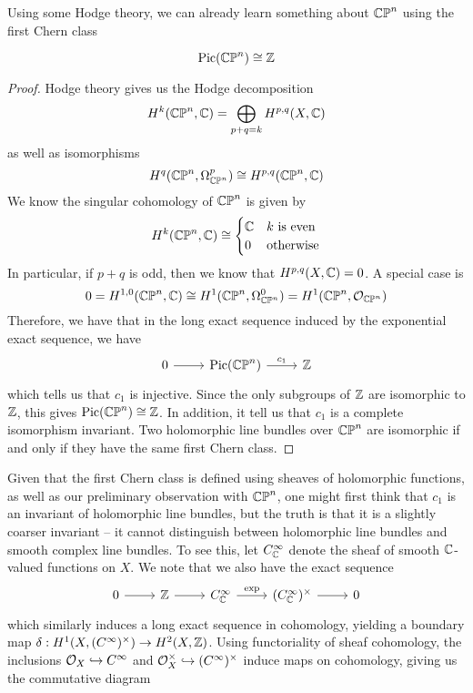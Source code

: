 Using some Hodge theory, we can already learn something about
$\mathbb{CP}^n$ using the first Chern class
%
\begin{thm}
\[
\mathrm{Pic}(\mathbb{CP}^n) \cong \mathbb{Z}
\]
\end{thm}
%
\begin{proof}
Hodge theory gives us the Hodge decomposition
\[
H^k(\mathbb{CP}^n, \mathbb{C}) = \bigoplus_{p+q=k} H^{p,q}(X, \mathbb{C})
\]
as well as isomorphisms
\[
H^q(\mathbb{CP}^n, \Omega^p_{\mathbb{CP}^n}) \cong H^{p,q}(\mathbb{CP}^n, \mathbb{C})
\]
We know the singular cohomology of $\mathbb{CP}^n$ is given by
\[
H^k(\mathbb{CP}^n, \mathbb{C}) \cong \begin{cases}
\mathbb{C} & k \text{ is even} \\
0 & \text{otherwise}
\end{cases}
\]
In particular, if $p+q$ is odd, then we know that $H^{p,q}(X,\mathbb{C}) = 0$.
A special case is
\[
0 = H^{1,0}(\mathbb{CP}^n, \mathbb{C}) \cong H^1(\mathbb{CP}^n, \Omega^0_{\mathbb{CP}^n}) = H^1(\mathbb{CP}^n, \mathcal{O}_{\mathbb{CP}^n})
\]
Therefore, we have that in the long exact sequence induced by the exponential exact
sequence, we have
\[\begin{tikzcd}
0 \ar[r] & \mathrm{Pic}(\CP^n) \ar[r, "c_1"] & \Z
\end{tikzcd}\]
which tells us that $c_1$ is injective. Since the only subgroups of $\mathbb{Z}$
are isomorphic to $\mathbb{Z}$, this gives $\mathrm{Pic}(\mathbb{CP}^n) \cong \mathbb{Z}$. In addition,
it tell us that $c_1$ is a complete isomorphism invariant. Two holomorphic line bundles
over $\mathbb{CP}^n$ are isomorphic if and only if they have the same first Chern class.
\end{proof}
%
Given that the first Chern class is defined using sheaves of holomorphic functions,
as well as our preliminary observation with $\mathbb{CP}^n$, one might first think that $c_1$ is
an invariant of holomorphic line bundles, but the truth is that it is a slightly coarser
invariant -- it cannot distinguish between holomorphic line bundles and smooth complex
line bundles. To see this, let $C^\infty_{\mathbb{C}}$ denote the sheaf of smooth $\mathbb{C}$-valued
functions on $X$. We note that we also have the exact sequence
\[\begin{tikzcd}
0 \ar[r] & \Z \ar[r] & C_\C^\infty \ar[r, "\mathrm{exp}"] & (C_\C^\infty)^\times \ar[r] & 0
\end{tikzcd}\]
which similarly induces a long exact sequence in cohomology, yielding a boundary
map $\delta : H^1(X, (C^\infty)^\times) \to H^2(X, \mathbb{Z})$. Using functoriality
of sheaf cohomology, the inclusions $\mathcal{O}_X \hookrightarrow C^\infty$ and
$\mathcal{O}_X^\times \hookrightarrow (C^\infty)^\times$ induce maps on cohomology, giving
us the commutative diagram

